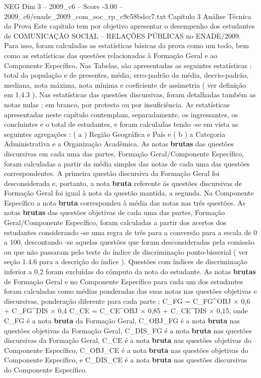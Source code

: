 \begin{textsample}{NEG Dim 3 – 2009\_c6 – Score -3.00 – 2009\_c6/enade\_2009\_com\_soc\_rp\_c9c58bdcc7.txt}  \label{ex:f3_neg_042}
Capítulo 3 Análise Técnica da Prova Este capítulo tem por objetivo apresentar o desempenho dos estudantes de COMUNICAÇÃO SOCIAL – RELAÇÕES PÚBLICAS no ENADE/2009.
Para isso, foram calculadas as estatísticas básicas da prova como um todo, bem como as estatísticas das questões relacionadas à Formação Geral e ao Componente Específico.
Nas Tabelas, são apresentadas as seguintes estatísticas : total da população e de presentes, média, erro-padrão da média, desvio-padrão, mediana, nota máxima, nota mínima e coeficiente de assimetria ( ver definição em 1.4.3 ).
Nas estatísticas das questões discursivas, foram detalhadas também as notas nulas : em branco, por protesto ou por insuficiência.
As estatísticas apresentadas neste capítulo contemplam, separadamente, os ingressantes, os concluintes e o total de estudantes, e foram calculadas tendo -se em vista as seguintes agregações : ( a ) Região Geográfica e País e ( b ) a Categoria Administrativa e a Organização Acadêmica.
As notas \textbf{brutas} das questões discursivas em cada uma das partes, Formação Geral/Componente Específico, foram calculadas a partir da média simples das notas de cada uma das questões correspondentes.
A primeira questão discursiva da Formação Geral foi desconsiderada e, portanto, a nota \textbf{bruta} referente ás questões discursivas de Formação Geral foi igual à nota da questão mantida, a segunda.
Na Componente Específico a nota \textbf{bruta} correspondeu à média das notas nas três questões.
As notas \textbf{brutas} das questões objetivas de cada uma das partes, Formação Geral/Componente Específico, foram calculadas a partir dos acertos dos estudantes considerando -se uma regra de três para a conversão para a escala de 0 a 100, descontando -se aquelas questões que foram desconsideradas pela comissão ou que não passaram pelo teste do índice de discriminação ponto-bisserial ( ver seção 1.4.6 para a descrição do índice ).
Questões com índices de discriminação inferior a 0,2 foram excluídas do cômputo da nota do estudante.
As notas \textbf{brutas} de Formação Geral e no Componente Específico para cada um dos estudantes foram calculadas como médias ponderadas das suas notas nas questões objetivas e discursivas, ponderação diferente para cada parte : C\_FG = C\_FG\textasciicircum{}OBJ × 0,6 + C\_FG\textasciicircum{}DIS × 0,4 C\_CE = C\_CE\textasciicircum{}OBJ × 0,85 + C\_CE\textasciicircum{}DIS × 0,15, onde C\_FG é a nota \textbf{bruta} da Formação Geral, C\_OBJ\_FG é a nota \textbf{bruta} nas questões objetivas da Formação Geral, C\_DIS\_FG é a nota \textbf{bruta} nas questões discursivas da Formação Geral, C\_CE é a nota \textbf{bruta} nas questões objetivas do Componente Específico, C\_OBJ\_CE é a nota \textbf{bruta} nas questões objetivas do Componente Específico, e C\_DIS\_CE é a nota \textbf{bruta} nas questões discursivas do Componente Específico.

\end{textsample}

